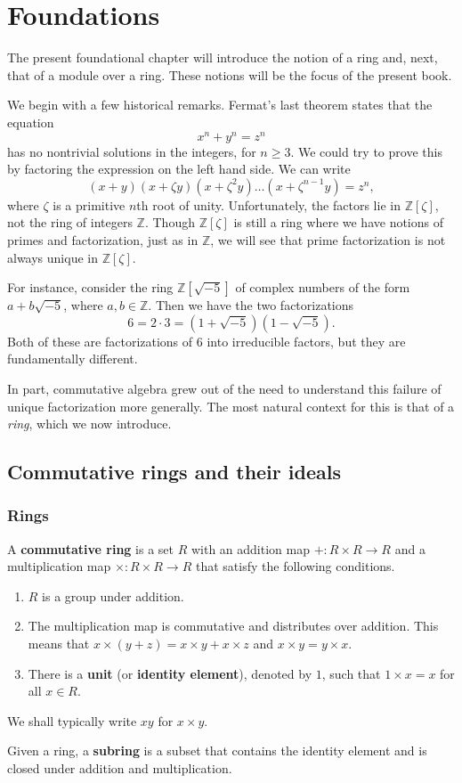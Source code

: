 
\chapter{Foundations}
\label{foundations}


The present foundational chapter will introduce the notion of a ring and,
next, that of  a module over a ring. These notions will be the focus of the
present book.

We begin with a few historical remarks.  Fermat's last theorem states that the
equation
  \[ \label{ft} x^n  + y^n = z^n \]
has no nontrivial solutions in the integers, for $n \ge 3$.  We could try to
prove this by factoring the expression on the left hand side. We can write
  \[ (x+y)(x+ \zeta y) (x+ \zeta^2y) \dots (x+ \zeta^{n-1}y) = z^n, \]
where $\zeta$ is a primitive $n$th root of unity.  Unfortunately, the factors
lie in $\mathbb{Z}[\zeta]$, not the ring of integers $\mathbb{Z}$.  Though
$\mathbb{Z}[\zeta]$ is still a ring where we have notions of primes and
factorization, just as in $\mathbb{Z}$, we will see that prime factorization
is not always unique in $\mathbb{Z}[\zeta]$.

For instance, consider the ring
$\mathbb{Z}[\sqrt{-5}]$ of complex numbers of the form $a + b\sqrt{-5}$, where
$a, b \in \mathbb{Z}$.  Then we have the two factorizations
  \[ 6 = 2 \cdot 3 = (1 + \sqrt{-5})(1 - \sqrt{-5}). \]
Both of these are factorizations of 6 into irreducible factors, but they
are fundamentally different.

In part, commutative algebra grew out of the need to understand this failure
of unique factorization more generally.
The most natural context for this is that of a \emph{ring}, which we now
introduce. 

\section{Commutative rings and their ideals}

\subsection{Rings}
\begin{definition} 
A \textbf{commutative ring} is a set $R$ with an addition map
$+ : R \times R \to R$ and a multiplication map $\times : R \times R \to R$
that satisfy the following conditions.

\begin{enumerate}
  \item $R$ is a group under addition.
  \item The multiplication map is commutative and distributes over addition.
  This means that $x \times (y+z) = x \times y + x\times z$ and $x \times y = y
  \times x$.
  \item There is a \textbf{unit} (or \textbf{identity element}), denoted by
        $1$, such that $1 \times x = x$ for all $x \in R$.
\end{enumerate}
We shall typically write $xy$ for $x \times y$.

Given a ring, a \textbf{subring} is a subset that contains the identity
element and is closed under addition and multiplication.
\end{definition} 

